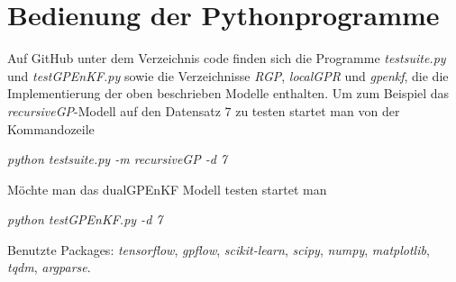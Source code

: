 \documentclass[ngerman]{scrartcl}
\begin{document}
\section{Bedienung der Pythonprogramme}
Auf GitHub unter dem Verzeichnis code finden sich die Programme \emph{testsuite.py} und \emph{testGPEnKF.py} sowie die Verzeichnisse \emph{RGP}, \emph{localGPR} und \emph{gpenkf}, die die Implementierung der oben beschrieben Modelle enthalten.  Um zum Beispiel das \emph{recursiveGP}-Modell auf den Datensatz 7 zu testen  startet man von der Kommandozeile 
\begin{center}
\emph{python testsuite.py -m recursiveGP -d 7}
\end{center}
Möchte man das dualGPEnKF Modell testen startet man
\begin{center}
\emph{python testGPEnKF.py -d 7}
\end{center}
Benutzte Packages: \emph{tensorflow}, \emph{gpflow}, \emph{scikit-learn}, \emph{scipy},  \emph{numpy}, \emph{matplotlib}, \emph{tqdm}, \emph{argparse}.




\end{document}
